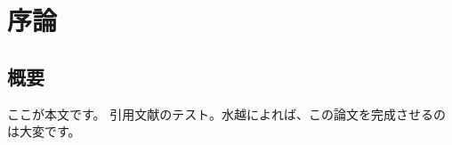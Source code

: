 \chapter{序論}\label{introduction}

\section{概要}
ここが本文です。
引用文献のテスト。水越\cite{mzks}によれば、この論文を完成させるのは大変です。

